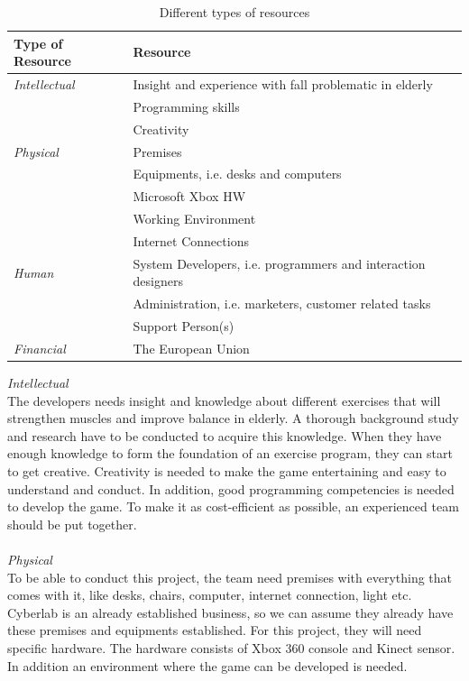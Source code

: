 \begin{table}
\centering
    \begin{tabular}{|l|l|}
        \hline
       \textbf{Type of Resource} & \textbf{Resource}  \\ \hline
       \emph{Intellectual} & Insight and experience with fall problematic in elderly \\ \cline{2-2}
        & Programming skills \\ \cline{2-2}
	 	& Creativity \\ \hline
	   \emph{Physical} & Premises \\ \cline{2-2}
	   	& Equipments, i.e. desks and computers \\ \cline{2-2}
	   	& Microsoft Xbox HW \\ \cline{2-2}
	   	& Working Environment \\ \cline{2-2}
	   	& Internet Connections \\ \hline
	   \emph{Human} & System Developers, i.e. programmers and interaction designers \\ \cline{2-2}
	   	& Administration, i.e. marketers, customer related tasks \\ \cline{2-2}
	   	& Support Person(s) \\ \hline
	   \emph{Financial} & The European Union \\
        \hline
    \end{tabular}
    \caption[Resources]{Different types of resources}
    \label{tab:Resources}
\end{table} 
\emph{Intellectual} \\ The developers needs insight and knowledge about different exercises that will strengthen muscles and improve balance in elderly. A thorough background study and research have to be conducted to acquire this knowledge. When they have enough knowledge to form the foundation of an exercise program, they can start to get creative. Creativity is needed to make the game entertaining and easy to understand and conduct. In addition, good programming competencies is needed to develop the game. To make it as cost-efficient as possible, an experienced team should be put together. \\ \\
\emph{Physical} \\ To be able to conduct this project, the team need premises with everything that comes with it, like desks, chairs, computer, internet connection, light etc. Cyberlab is an already established business, so we can assume they already have these premises and equipments established. For this project, they will need specific hardware. The hardware consists of Xbox 360 console and Kinect sensor. In addition an environment where the game can be developed is needed. \\ \\
